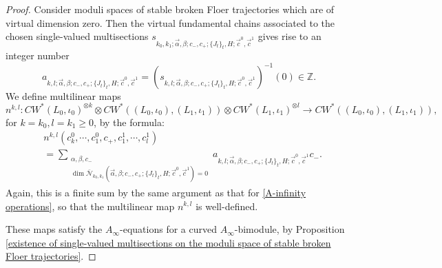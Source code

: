 \documentclass{amsart}
\numberwithin{equation}{section}
\numberwithin{figure}{section}
\begin{document}
\begin{proof}
	Consider moduli spaces of stable broken Floer trajectories which are of virtual dimension zero. Then the virtual fundamental chains associated to the chosen single-valued multisections $s_{k_{0}, k_{1}; \vec{\alpha}, \beta; c_{-}, c_{+}; \{J_{t}\}_{t}, H; \vec{c}^{0}, \vec{c}^{1}}$ gives rise to an integer number
\begin{equation}
a_{k, l; \vec{\alpha}, \beta; c_{-}, c_{+}; \{J_{t}\}_{t}, H; \vec{c}^{0}, \vec{c}^{1}} = (s_{k, l; \vec{\alpha}, \beta; c_{-}, c_{+}; \{J_{t}\}_{t}, H; \vec{c}^{0}, \vec{c}^{1}})^{-1}(0) \in \mathbb{Z}.
\end{equation}
We define multilinear maps
\begin{equation}
n^{k, l}: CW^{*}(L_{0}, \iota_{0})^{\otimes k} \otimes CW^{*}((L_{0}, \iota_{0}), (L_{1}, \iota_{1})) \otimes CW^{*}(L_{1}, \iota_{1})^{\otimes l} \to CW^{*}((L_{0}, \iota_{0}), (L_{1}, \iota_{1})),
\end{equation}
for $k = k_{0}, l = k_{1} \ge 0$, by the formula:
\begin{equation}
\begin{split}
&n^{k, l}(c^{0}_{k}, \cdots, c^{0}_{1}, c_{+}, c^{1}_{1}, \cdots, c^{1}_{l})\\
&= \sum_{\substack{\alpha, \beta, c_{-}\\ \dim \bar{\mathcal{N}}_{k_{0}, k_{1}}(\vec{\alpha}, \beta; c_{-}, c_{+}; \{J_{t}\}_{t}, H; \vec{c}^{0}, \vec{c}^{1}) = 0}}
a_{k, l; \vec{\alpha}, \beta; c_{-}, c_{+}; \{J_{t}\}_{t}, H; \vec{c}^{0}, \vec{c}^{1}} c_{-}.
\end{split}
\end{equation}
Again, this is a finite sum by the same argument as that for \eqref{A-infinity operations}, so that the multilinear map $n^{k, l}$ is well-defined. \par
	These maps satisfy the $A_{\infty}$-equations for a curved $A_{\infty}$-bimodule, by Proposition \eqref{existence of single-valued multisections on the moduli space of stable broken Floer trajectories}. \par
\end{proof}
\end{document}
